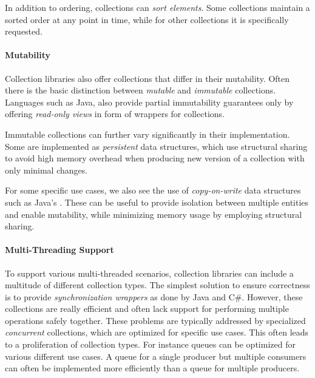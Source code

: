 \documentclass[sigconf, 10pt]{acmart}
\begin{document}
In addition to ordering, collections can \emph{sort elements}.
Some collections maintain a sorted order at any point in time,
while for other collections it is specifically requested.

\paragraph{Mutability}


Collection libraries also offer collections that differ in their mutability.
Often there is the basic distinction between
\emph{mutable} and \emph{immutable} collections.
Languages such as Java, also provide partial immutability guarantees only
by offering \emph{read-only views} in form of wrappers for collections.

Immutable collections can further vary significantly in their implementation.
Some are implemented as \emph{persistent} data structures,
which use structural sharing to avoid high memory overhead when producing
new version of a collection with only minimal changes.

For some specific use cases,
we also see the use of \emph{copy-on-write} data structures
such as Java's .
These can be useful to provide isolation between multiple entities
and enable mutability,
while minimizing memory usage by employing structural sharing.

\paragraph{Multi-Threading Support}


To support various multi-threaded scenarios, 
collection libraries can include a multitude of different collection types.
The simplest solution to ensure correctness is
to provide \emph{synchronization wrappers} as done by Java and C\#.
However, these collections are really efficient
and often lack support for performing multiple operations safely together.
These problems are typically addressed
by specialized \emph{concurrent} collections,
which are optimized for specific use cases.
This often leads to a proliferation of collection types.
For instance queues can be optimized for various different use cases.
A queue for a single producer but multiple consumers can often be implemented
more efficiently than a queue for multiple producers.
\end{document}
